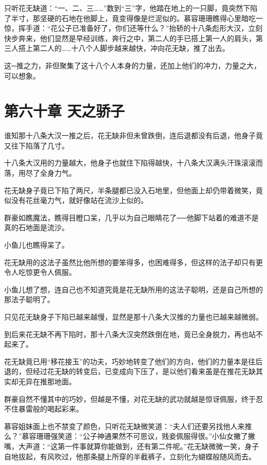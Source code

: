 \documentclass[12pt,oneside]{book}
\begin{document}
只听花无缺道：``一、二、三\ldots\ldots{}''数到``三''字，他踏在地上的一只脚，竟突然下陷了半寸，那坚硬的石地在他脚上，竟变得像是烂泥似的。慕容珊珊瞧得心里暗吃一惊，挥手道：``花公子已准备好了，你们还等什么？''抬轿的十八条彪形大汉，立刻快步奔来，他们显然是早经训练，奔行之中，第二人的手已搭上第一人的肩头，第三人搭上第二人的\ldots\ldots 十八个人脚步越来越快，冲向花无缺，推了出去。

这─推之力，非但聚集了这十八个人本身的力量，还加上他们的冲力，力量之大，可以想象。

\hypertarget{ux7b2cux516dux5341ux7ae0-ux5929ux4e4bux9a84ux5b50}{%
\chapter{第六十章
天之骄子}\label{ux7b2cux516dux5341ux7ae0-ux5929ux4e4bux9a84ux5b50}}

谁知那十八条大汉一推之后，花无缺非但未曾跌倒，连后退都没有后退，他身子竟又往下陷落了几寸。

十八条大汉用的力量越大，他身子也就住下陷得越快，十八条大汉满头汗珠滚滚而落，用尽了全身力气。

花无缺身子竟已下陷了两尺，半条腿都已没入石地里，但他面上却仍带着微笑，竟似没有花丝毫力气，就好像站在流沙上似的。

群豪如瞧魔法，瞧得目瞪口呆，几乎以为自己眼睛花了──他脚下站着的难道不是真的石地面是流沙。

小鱼儿也瞧得呆了。

花无缺用的这法子虽然比他所想的要笨得多，也困难得多，但这样的法子却只有更令人吃惊更令人佩服。

小鱼儿想了想，连自己也不知道究竟是花无缺所用的这法子聪明，还是自己所想的那法子聪明了。

只见花无缺身子下陷已越来越慢，显然是那十八条大汉推的力量也已越来越微弱。

到后来花无缺不再下陷时，那十八条大汉突然跌倒在地，竟已全身脱力，再也站不起来了。

花无缺竟已用``移花接玉''的功夫，巧妙地转变了他们的方向，他们的力量本是往后退的，但经过花无缺的转变后，已变成向下压了，是以他们看来虽是在推花无缺其实却无异在推那地面。

群豪自然不懂其中的巧妙，但越是不懂，对花无缺的武功就越是惊讶佩服，终于忍不住暴雷般的喝起彩来。

慕容姐妹面上也不禁变了颜色，只听花无缺微笑道：``夫人们还要另找他人来推么？''慕容珊珊强笑道：``公子神通果然不可思议，贱妾佩服得很。''小仙女撇了撇嘴，大声道：``这第一件事就算你能做到，还有第二件呢。''花无缺微微一笑，身子自地拔起，有风吹过，他那条腿上所穿的半截裤子，立刻化为蝴蝶般随风而去。
\end{document}

